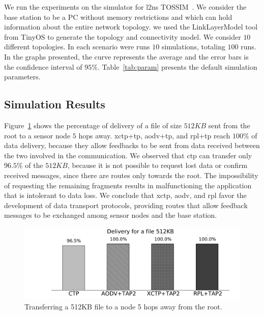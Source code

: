

We run the experiments on the simulator for \ac{l2ns} TOSSIM~\cite{tossim}. We consider the base station to be a PC without memory restrictions and which can hold information about the entire network topology. we used the LinkLayerModel tool from TinyOS to generate the topology and connectivity model. We consider $10$ different topologies. In each scenario were runs $10$ simulations, totaling $100$ runs. In the graphs presented, the curve represents the average and the error bars is the confidence interval of $95\%$. Table~\ref{tab:param} presents the default simulation parameters.


\subsection{Simulation Results}
\label{sec:simulation-results}

Figure~\ref{fig:delivery-512KB} shows the percentage of delivery of a file of size $512KB$ sent from the root to a sensor node $5$ hops away. \ac{xctp}+\ac{tp}, \ac{aodv}+\ac{tp}, and \ac{rpl}+\ac{tp} reach $100\%$ of data delivery, because they allow feedbacks to be sent from data received between the two involved in the communication. We observed that \ac{ctp} can transfer only $96.5\%$ of the $512KB$, because it is not possible to request lost data or confirm received messages, since there are routes only towards the root. The impossibility of requesting the remaining fragments results in malfunctioning the application that is intolerant to data loss. We conclude that \ac{xctp}, \ac{aodv}, and \ac{rpl}  favor the development of data transport protocols, providing routes that allow feedback messages to be exchanged among sensor nodes and the base station.

\begin{figure}[t]
\centerline{
    \includegraphics[width=0.8\linewidth]{img/entrega-512KB}
} \caption{Transferring a 512KB file to a node 5 hops away
from the root.} \label{fig:delivery-512KB}
\end{figure}

